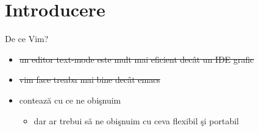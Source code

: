 \documentclass{beamer}
\begin{document}
\section{Introducere}
\frame{\tableofcontents}

\begin{frame}{De ce Vim?}
\begin{itemize}
  \item<1-> \sout{un editor text-mode este mult mai eficient decât un IDE
  grafic}
  \item<2-> \sout{vim face treaba mai bine decât emacs}
  \item<3-> contează cu ce ne obişnuim
    \begin{itemize}
    \item<4-> dar ar trebui să ne obişnuim cu ceva flexibil şi portabil
    \end{itemize}
\end{itemize}
\end{frame}

\end{document}
